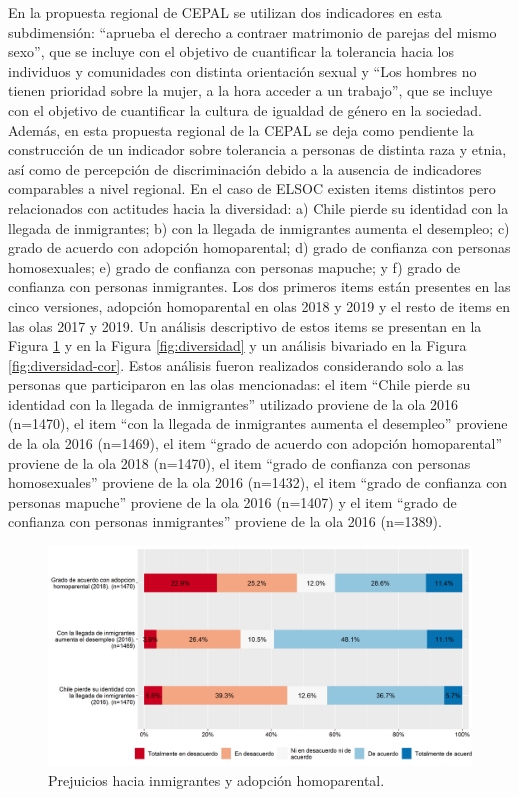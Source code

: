 \documentclass[
  12pt,
]{book}
\begin{document}
En la propuesta regional de CEPAL se utilizan dos indicadores en esta subdimensión: ``aprueba el derecho a contraer matrimonio de parejas del mismo sexo'', que se incluye con el objetivo de cuantificar la tolerancia hacia los individuos y comunidades con distinta orientación sexual y ``Los hombres no tienen prioridad sobre la mujer, a la hora acceder a un trabajo'', que se incluye con el objetivo de cuantificar la cultura de igualdad de género en la sociedad. Además, en esta propuesta regional de la CEPAL se deja como pendiente la construcción de un indicador sobre tolerancia a personas de distinta raza y etnia, así como de percepción de discriminación debido a la ausencia de indicadores comparables a nivel regional. En el caso de ELSOC existen items distintos pero relacionados con actitudes hacia la diversidad: a) Chile pierde su identidad con la llegada de inmigrantes; b) con la llegada de inmigrantes aumenta el desempleo; c) grado de acuerdo con adopción homoparental; d) grado de confianza con personas homosexuales; e) grado de confianza con personas mapuche; y f) grado de confianza con personas inmigrantes. Los dos primeros items están presentes en las cinco versiones, adopción homoparental en olas 2018 y 2019 y el resto de items en las olas 2017 y 2019. Un análisis descriptivo de estos items se presentan en la Figura \ref{fig:prejuicios} y en la Figura \ref{fig:diversidad} y un análisis bivariado en la Figura \ref{fig:diversidad-cor}. Estos análisis fueron realizados considerando solo a las personas que participaron en las olas mencionadas: el item ``Chile pierde su identidad con la llegada de inmigrantes'' utilizado proviene de la ola 2016 (n=1470), el item ``con la llegada de inmigrantes aumenta el desempleo'' proviene de la ola 2016 (n=1469), el item ``grado de acuerdo con adopción homoparental'' proviene de la ola 2018 (n=1470), el item ``grado de confianza con personas homosexuales'' proviene de la ola 2016 (n=1432), el item ``grado de confianza con personas mapuche'' proviene de la ola 2016 (n=1407) y el item ``grado de confianza con personas inmigrantes'' proviene de la ola 2016 (n=1389).

\begin{figure}[H]

{\centering \includegraphics[width=1\linewidth,height=1\textheight]{output/graphs/prejuicios} 

}

\caption{Prejuicios hacia inmigrantes y adopción homoparental.}\label{fig:prejuicios}
\end{figure}
\end{document}
